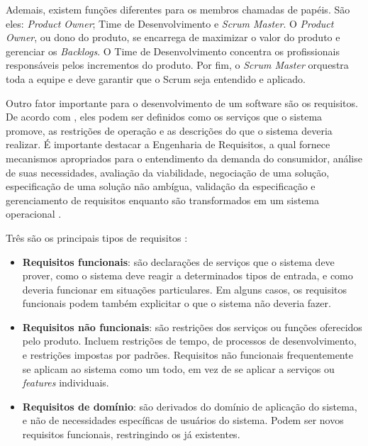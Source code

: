 Ademais, existem funções diferentes para os membros chamadas de papéis. São eles: \textit{Product Owner}; Time de Desenvolvimento e \textit{Scrum Master}. 
O \textit{Product Owner}, ou dono do produto, se encarrega de maximizar o valor do produto e gerenciar os \textit{Backlogs}. O Time de Desenvolvimento concentra os profissionais responsáveis pelos incrementos do produto. Por fim, o \textit{Scrum Master} orquestra toda a equipe e deve garantir que o Scrum seja entendido e aplicado.

Outro fator importante para o desenvolvimento de um software são os requisitos. De acordo com \cite{Sommervile2010}, eles podem ser definidos como os serviços que o sistema promove, as restrições de operação e as descrições do que o sistema deveria realizar. É importante destacar a Engenharia de Requisitos, a qual fornece mecanismos apropriados para o entendimento da demanda do consumidor, análise de suas necessidades, avaliação da viabilidade, negociação de uma solução, especificação de uma solução não ambígua, validação da especificação e gerenciamento de requisitos enquanto são transformados em um sistema operacional \citep{Pressman2014}. 

Três são os principais tipos de requisitos \citep{Sommervile2010}:
\begin{itemize}
    \item \textbf{Requisitos funcionais}: são declarações de serviços que o sistema deve prover, como o sistema deve reagir a determinados tipos de entrada, e como deveria funcionar em situações particulares. Em alguns casos, os requisitos funcionais podem também explicitar o que o sistema não deveria fazer.
    
    \item \textbf{Requisitos não funcionais}: são restrições dos serviços ou funções oferecidos pelo produto. Incluem restrições de tempo, de processos de desenvolvimento, e restrições impostas por padrões. Requisitos não funcionais frequentemente se aplicam ao sistema como um todo, em vez de se aplicar a serviços ou \textit{features} individuais.
    
    \item \textbf{Requisitos de domínio}: são derivados do domínio de aplicação do sistema, e não de necessidades específicas de usuários do sistema. Podem ser novos requisitos funcionais, restringindo os já existentes. 
\end{itemize}


